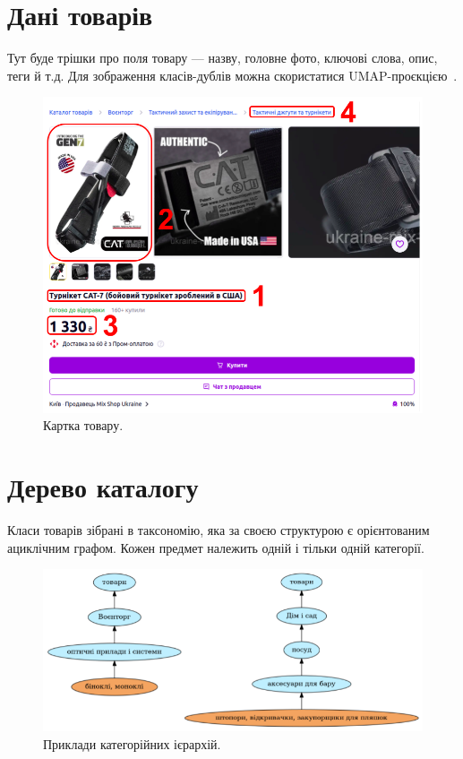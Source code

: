 \documentclass[fleqn,12pt,a4paper]{report}
\theoremstyle{plain}
\theoremstyle{definition}
\numberwithin{equation}{chapter}
\numberwithin{figure}{chapter}
\numberwithin{table}{chapter}
\numberwithin{footnote}{chapter}
\numberwithin{figure}{chapter}
\numberwithin{theorem}{chapter}
\numberwithin{definition}{chapter}
\begin{document}
    \newpage


    \section{Дані товарів}\label{sec:section1.2}

    Тут буде трішки про поля товару --- назву, головне фото, ключові слова, опис, теги й т.д.
    Для зображення класів-дублів можна скористатися UMAP-проєкцією~\cite{mcinnes2018umap-software}.

    \noindent
    \begin{figure}[ht]
        \includegraphics[width=\textwidth]{images/catify-product}
        \caption{Картка товару.}
    \end{figure}

    \newpage


    \section{Дерево каталогу}\label{sec:section1.3}

    Класи товарів зібрані в таксономію, яка за своєю структурою є орієнтованим ациклічним графом.
    Кожен предмет належить одній і тільки одній категорії.

    \noindent
    \begin{figure}[ht]
        \includegraphics[width=\textwidth]{images/catify-hierarchies}
        \caption{Приклади категорійних ієрархій.}
    \end{figure}
\end{document}
